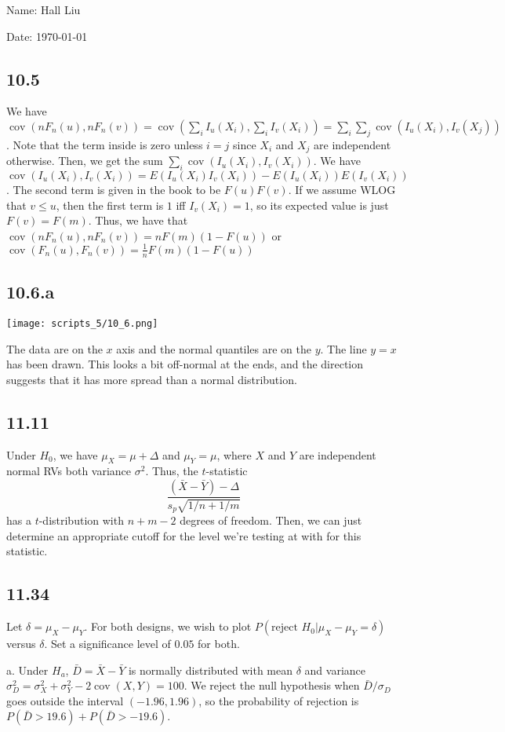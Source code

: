 \documentclass{article}
\DeclareMathOperator{\cov}{cov}
\begin{document}
Name: Hall Liu

Date: \today 

\subsection*{10.5}
We have $\cov(nF_n(u),nF_n(v))=\cov(\sum_iI_u(X_i),\sum_iI_v(X_i))=\sum_i\sum_j\cov(I_u(X_i),I_v(X_j))$. Note that the term inside is zero unless $i=j$ since $X_i$ and $X_j$ are independent otherwise. Then, we get the sum $\sum_i\cov(I_u(X_i),I_v(X_i))$. We have $\cov(I_u(X_i),I_v(X_i))=E(I_u(X_i)I_v(X_i))-E(I_u(X_i))E(I_v(X_i))$. The second term is given in the book to be $F(u)F(v)$. If we assume WLOG that $v\leq u$, then the first term is $1$ iff $I_v(X_i)=1$, so its expected value is just $F(v)=F(m)$. Thus, we have that $\cov(nF_n(u),nF_n(v))=nF(m)(1-F(u))$ or $\cov(F_n(u),F_n(v))=\frac{1}{n}F(m)(1-F(u))$
\subsection*{10.6.a}
\texttt{[image: scripts\_5/10\_6.png]}

The data are on the $x$ axis and the normal quantiles are on the $y$. The line $y=x$ has been drawn. This looks a bit off-normal at the ends, and the direction suggests that it has more spread than a normal distribution.
\subsection*{11.11}
Under $H_0$, we have $\mu_X=\mu+\Delta$ and $\mu_Y=\mu$, where $X$ and $Y$ are independent normal RVs both variance $\sigma^2$. Thus, the $t$-statistic 
$$\frac{(\bar{X}-\bar{Y})-\Delta}{s_p\sqrt{1/n+1/m}}$$
has a $t$-distribution with $n+m-2$ degrees of freedom. Then, we can just determine an appropriate cutoff for the level we're testing at with for this statistic.
\subsection*{11.34}
Let $\delta=\mu_X-\mu_Y$. For both designs, we wish to plot $P(\text{reject }H_0|\mu_X-\mu_Y=\delta)$ versus $\delta$. Set a significance level of $0.05$ for both.

\noindent a. Under $H_a$, $\bar{D}=\bar{X}-\bar{Y}$ is normally distributed with mean $\delta$ and variance $\sigma_D^2=\sigma_X^2+\sigma_Y^2-2\cov(X,Y)=100$. We reject the null hypothesis when $\bar{D}/\sigma_D$ goes outside the interval $(-1.96,1.96)$, so the probability of rejection is $P(\bar{D}>19.6)+P(\bar{D}>-19.6)$.
\end{document}
